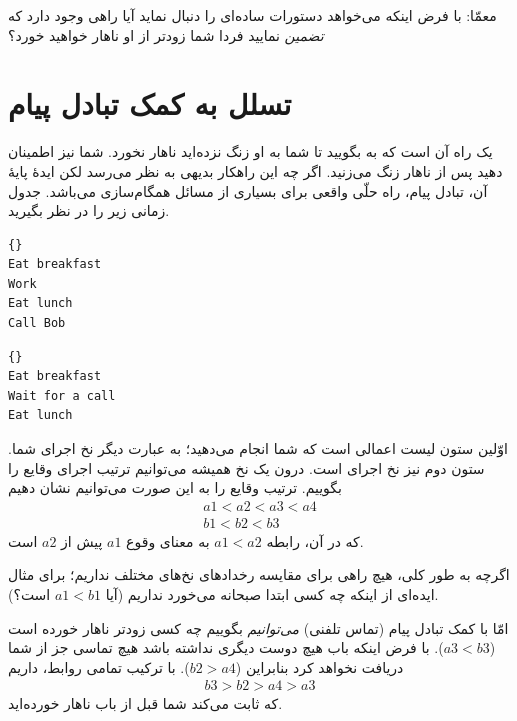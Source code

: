 \documentclass{book}
\newcommand{\clearemptydoublepage}{\newpage\cleardoublepage}
\begin{document}
    معمّا: با فرض اینکه  می‌خواهد دستورات ساده‌ای را دنبال نماید آیا راهی وجود دارد که \emph{تضمین} نمایید فردا شما زودتر از او ناهار خواهید خورد؟
    
\clearemptydoublepage
\section {تسلل به کمک تبادل پیام}
\label{serialization}

    یک راه آن است که به  بگویید تا شما به او زنگ نزده‌اید ناهار نخورد. شما نیز  اطمینان دهید پس از ناهار زنگ می‌زنید. 
    اگر چه این راهکار بدیهی به نظر می‌رسد لکن ایدهٔ پایهٔ آن، تبادل پیام، راه حلّی واقعی برای بسیاری
    از مسائل همگام‌سازی می‌باشد. جدول زمانی زیر را در نظر بگیرید. 
    
\begin{latin}
\begin{minipage}[t]{2in}
\begin{latin}
\begin{lstlisting}[title=\rl{نخ \lr{A} (شما)}]{}
Eat breakfast 
Work          
Eat lunch     
Call Bob
\end{lstlisting}
\end{latin}
\end{minipage}
\hfill
\begin{minipage}[t]{2in}
\begin{latin}
\begin{lstlisting}[title=\rl{نخ \lr{B} (‌Bob)}]{}
Eat breakfast
Wait for a call
Eat lunch
\end{lstlisting}
\end{latin}
\end{minipage}
\end{latin}
%
    اوّلین ستون لیست اعمالی است که شما انجام می‌دهید؛ به عبارت دیگر نخ اجرای شما. 
    ستون دوم نیز نخ اجرای  است. درون یک نخ همیشه می‌توانیم ترتیب اجرای وقایع را بگوییم. 
    ترتیب وقایع را به این صورت می‌توانیم نشان دهیم
%
\begin{eqnarray*}
a1 < a2 < a3 < a4  \\
b1 < b2 < b3
\end{eqnarray*}
%
    که در آن، رابطه  $a1 < a2$ به معنای وقوع  $a1$ پیش از  $a2$ است. 

    اگرچه به طور کلی، هیچ راهی برای مقایسه رخدادهای نخ‌های مختلف نداریم؛ برای مثال ایده‌ای از اینکه چه کسی ابتدا صبحانه می‌خورد نداریم 
    (آیا $a1 < b1$  است؟).
    
    امّا با کمک تبادل پیام (تماس تلفنی) \emph{می‌توانیم} بگوییم چه کسی زودتر ناهار خورده است ($a3 < b3$).
    با فرض اینکه باب هیچ دوست دیگری نداشته باشد هیچ تماسی جز از شما دریافت نخواهد کرد بنابراین  ($b2 > a4$).
    با ترکیب تمامی روابط، داریم 
%
\begin{eqnarray*}
b3 > b2 > a4 > a3
\end{eqnarray*}
%
    که ثابت می‌کند شما قبل از باب ناهار خورده‌اید. 
\end{document}
